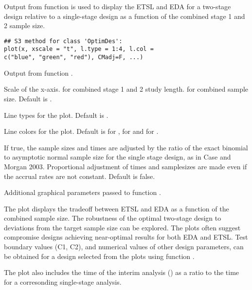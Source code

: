 \begin{Description}\relax
Output from function  is used to display the ETSL and
EDA for a two-stage design relative to a single-stage design as a
function of the combined stage 1 and 2 sample size.
\end{Description}
\begin{Usage}
\begin{verbatim}
## S3 method for class 'OptimDes':
plot(x, xscale = "t", l.type = 1:4, l.col =
c("blue", "green", "red"), CMadj=F, ...)
\end{verbatim}
\end{Usage}
\begin{Arguments}
\begin{ldescription}
\item[\code{x}] Output from function .
\item[\code{xscale}] Scale of the x-axis.  for combined stage 1
and 2 study length.   for combined sample size. Default is .
\item[\code{l.type}] Line types for the plot. Default is .
\item[\code{l.col}] Line colors for the plot. Default is  for
,  for  and  for
.
\item[\code{CMadj}] If true, the sample sizes and times are adjusted by
the ratio of the exact binomial to asymptotic normal sample size for
the single stage design, as in Case and Morgan 2003.  Proportional
adjustment of times and samplesizes are made even if the accrual rates
are not constant.  Default is
false.  

\item[\code{...}] Additional graphical parameters passed to function .
\end{ldescription}
\end{Arguments}
\begin{Details}\relax
The plot displays the tradeoff between ETSL and EDA  as a function of
the combined sample size.  The robustness of the optimal two-stage  design to
deviations from the target sample size can be explored.  The plots
often suggest compromise designs achieving near-optimal results for
both EDA and ETSL.  Test boundary values (C1, C2), and numerical
values of other design parameters, can be obtained for a design
selected from the plots using function .

The plot also includes the time of the interim analysis () as a ratio to
the time for a corresonding single-stage analysis.
\end{Details}
